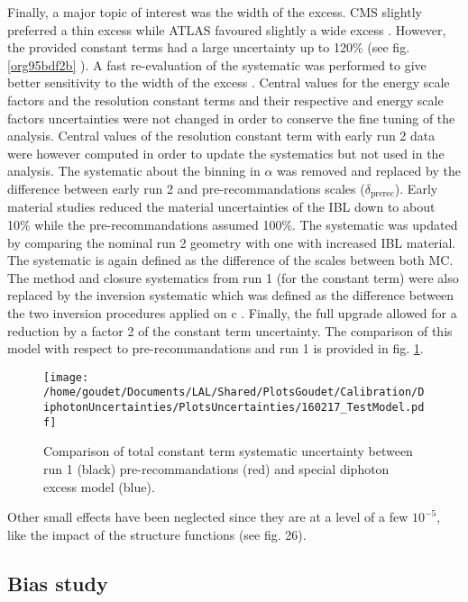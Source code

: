 Finally, a major topic of interest was the width of the excess.
CMS slightly preferred a thin excess \cite{CMS-PAS-EXO-16-018} while ATLAS favoured slightly a wide excess \cite{ATLAS-CONF-2016-018}.
However, the provided constant terms had a large uncertainty up to 120\% (see fig. \ref{org95bdf2b} ).
A fast re-evaluation of the systematic was performed to give better sensitivity to the width of the excess \cite{ATL-COM-PHYS-2016-184}.
Central values for the energy scale factors and the resolution constant terms and their respective and energy scale factors uncertainties were not changed in order to conserve the fine tuning of the analysis.
Central values of the resolution constant term with early run 2 data were however computed in order to update the systematics but not used in the analysis.
The systematic about the binning in $\alpha$ was removed and replaced by the difference between early run 2 and pre-recommandations scales (\(\delta_{\text{prerec}}\)).
Early material studies reduced the material uncertainties of the IBL down to about 10\% while the pre-recommandations assumed 100\%.
The systematic was updated by comparing the nominal run 2 geometry with one with increased IBL material.
The systematic is again defined as the difference of the scales between both MC.
The method and closure systematics from run 1 (for the constant term) were also replaced by the inversion systematic which was defined as the difference between the two inversion procedures applied on c \cite{Goudet_750Systematics}.
Finally, the full upgrade allowed for a reduction by a factor 2 of the constant term uncertainty.
The comparison of this model with respect to pre-recommandations and run 1 is provided in fig. \ref{fig:org3f93468}.

\begin{figure}[htbp]
\centering
\texttt{[image: /home/goudet/Documents/LAL/Shared/PlotsGoudet/Calibration/DiphotonUncertainties/PlotsUncertainties/160217\_TestModel.pdf]}
\caption{\label{fig:org3f93468}
Comparison of total constant term systematic uncertainty between run 1 (black) pre-recommandations (red) and special diphoton excess model (blue). \cite{ATL-COM-PHYS-2016-184}}
\end{figure}

Other small effects have been neglected since they are at a level of a few $10^{-5}$, like the impact of the structure functions (see \cite{0805.2093} fig. 26).

\subsection{Bias study}
\label{sec:orgd804911}
\label{sec:Calibration_inSitu_BiasInput}

